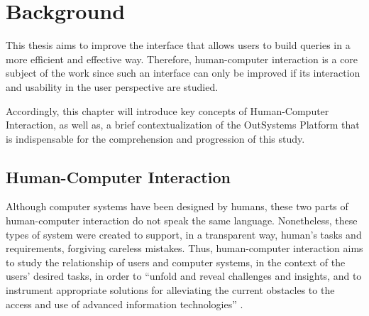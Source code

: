 \chapter{Background}
\label{cha:background}
This thesis aims to improve the interface that allows users to build queries in a more efficient and effective way. Therefore, human-computer interaction is a core subject of the work since such an interface can only be improved if its interaction and usability in the user perspective are studied.

Accordingly, this chapter will introduce key concepts of Human-Computer Interaction, as well as, a brief contextualization of the OutSystems Platform that is indispensable for the comprehension and progression of this study.

\section{Human-Computer Interaction}
\label{sec:human_computer_interaction}
Although computer systems have been designed by humans, these two parts of human-computer interaction do not speak the same language. Nonetheless, these types of system were created to support, in a transparent way, human’s tasks and requirements, forgiving careless mistakes. \cite{humanComputerInteraction} Thus, human-computer interaction aims to study the relationship of users and computer systems, in the context of the users’ desired tasks, in order to “unfold and reveal challenges and insights, and to instrument appropriate solutions for alleviating the current obstacles to the access and use of advanced information technologies” \cite{userInterfacesForAll_newPerspectivesIntoHumanComputerInteraction}. 




